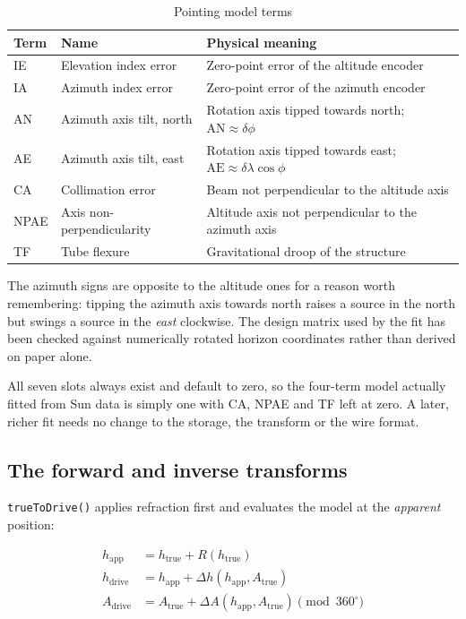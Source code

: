 \documentclass[11pt,a4paper]{article}
\begin{document}
\begin{table}[H]
\centering
\caption{Pointing model terms}
\begin{tabular}{llp{8cm}}
\toprule
\textbf{Term} & \textbf{Name} & \textbf{Physical meaning} \\
\midrule
IE & Elevation index error & Zero-point error of the altitude encoder \\
IA & Azimuth index error & Zero-point error of the azimuth encoder \\
AN & Azimuth axis tilt, north & Rotation axis tipped towards north; $\text{AN} \approx \delta\phi$ \\
AE & Azimuth axis tilt, east & Rotation axis tipped towards east; $\text{AE} \approx \delta\lambda\cos\phi$ \\
CA & Collimation error & Beam not perpendicular to the altitude axis \\
NPAE & Axis non-perpendicularity & Altitude axis not perpendicular to the azimuth axis \\
TF & Tube flexure & Gravitational droop of the structure \\
\bottomrule
\end{tabular}
\end{table}

The azimuth signs are opposite to the altitude ones for a reason worth remembering: tipping the azimuth axis towards north raises a source in the north but swings a source in the \emph{east} clockwise. The design matrix used by the fit has been checked against numerically rotated horizon coordinates rather than derived on paper alone.

All seven slots always exist and default to zero, so the four-term model actually fitted from Sun data is simply one with CA, NPAE and TF left at zero. A later, richer fit needs no change to the storage, the transform or the wire format.

\subsection{The forward and inverse transforms}

\texttt{trueToDrive()} applies refraction first and evaluates the model at the \emph{apparent} position:

\begin{align}
h_\text{app} &= h_\text{true} + R(h_\text{true}) \\
h_\text{drive} &= h_\text{app} + \Delta h(h_\text{app}, A_\text{true}) \\
A_\text{drive} &= A_\text{true} + \Delta A(h_\text{app}, A_\text{true}) \pmod{360^\circ}
\end{align}
\end{document}
